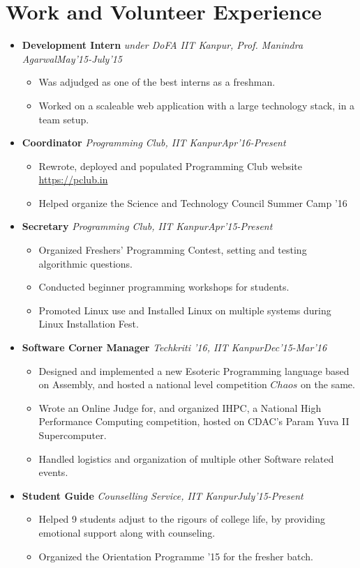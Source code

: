 \documentclass[11pt,a4paper]{moderncv}
\newcommand{\experience}[4]{
  \vspace{0.1cm}
\item \textbf{\large{#1}} \textit{#2}\hfill\textit{#3}
  \begin{itemize}[leftmargin=*]
    \setlength\itemsep{0em} #4
  \end{itemize}
}
\begin{document}
\section*{Work and Volunteer Experience}
\begin{itemize}
  \setlength\itemsep{0.5em}
  \experience{Development Intern}{under DoFA IIT Kanpur, Prof. Manindra Agarwal}{May'15-July'15}{
  \item Was adjudged as one of the best interns as a freshman.
  \item Worked on a scaleable web application with a large technology
    stack, in a team setup.
  }

  \experience{Coordinator}{Programming Club, IIT
    Kanpur}{Apr'16-Present}{
  \item Rewrote, deployed and populated Programming Club website \href{https://pclub.in}{https://pclub.in}
  \item Helped organize the Science and Technology Council Summer Camp
    '16
  }

  \experience{Secretary}{Programming Club, IIT Kanpur}{Apr'15-Present}{
  \item	Organized Freshers’ Programming Contest, setting and testing algorithmic questions.
  \item	Conducted beginner programming workshops for students.
  \item Promoted Linux use and Installed Linux on multiple systems during Linux Installation Fest.
  }

  \experience{Software Corner Manager}{Techkriti '16, IIT
    Kanpur}{Dec'15-Mar'16}{
  \item	Designed and implemented a new Esoteric Programming language
    based on Assembly, and hosted a national level competition $Chaos$
    on the same.
  \item	Wrote an Online Judge for, and organized IHPC, a National High Performance Computing competition, hosted on CDAC’s Param Yuva II Supercomputer.
  \item	Handled logistics and organization of multiple other Software related events.
  }

  \experience{Student Guide}{Counselling Service, IIT Kanpur}{July'15-Present}{
  \item Helped 9 students adjust to the rigours of college life, by providing emotional support along with counseling.
  \item Organized the Orientation Programme '15 for the fresher batch.
  }

\end{itemize}
\end{document}
